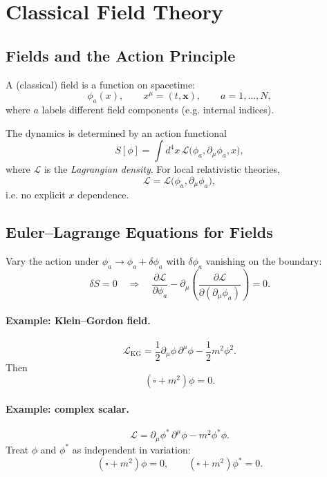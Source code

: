 \section{Classical Field Theory}

\subsection{Fields and the Action Principle}
A (classical) field is a function on spacetime:
\begin{equation}
\phi_a(x), \qquad x^\mu=(t,\mathbf{x}), \qquad a=1,\dots,N,
\end{equation}
where $a$ labels different field components (e.g. internal indices).

The dynamics is determined by an action functional
\begin{equation}
S[\phi] = \int d^4x\, \mathcal{L}\big(\phi_a,\partial_\mu\phi_a,x\big),
\end{equation}
where $\mathcal{L}$ is the \emph{Lagrangian density}. For local relativistic theories,
\begin{equation}
\mathcal{L}=\mathcal{L}\big(\phi_a,\partial_\mu\phi_a\big),
\end{equation}
i.e. no explicit $x$ dependence.

\subsection{Euler--Lagrange Equations for Fields}
Vary the action under $\phi_a\to \phi_a+\delta\phi_a$ with $\delta\phi_a$ vanishing on the boundary:
\begin{equation}
\delta S = 0 \quad \Rightarrow \quad
\frac{\partial\mathcal{L}}{\partial \phi_a}
-\partial_\mu\left(\frac{\partial\mathcal{L}}{\partial(\partial_\mu\phi_a)}\right)=0.
\end{equation}

\paragraph{Example: Klein--Gordon field.}
\begin{equation}
\mathcal{L}_{\mathrm{KG}}
=\frac{1}{2}\partial_\mu\phi\,\partial^\mu\phi-\frac{1}{2}m^2\phi^2.
\end{equation}
Then
\begin{equation}
(\square+m^2)\phi=0.
\end{equation}

\paragraph{Example: complex scalar.}
\begin{equation}
\mathcal{L}
=\partial_\mu\phi^\ast\,\partial^\mu\phi - m^2\phi^\ast\phi.
\end{equation}
Treat $\phi$ and $\phi^\ast$ as independent in variation:
\begin{equation}
(\square+m^2)\phi=0,\qquad (\square+m^2)\phi^\ast=0.
\end{equation}

